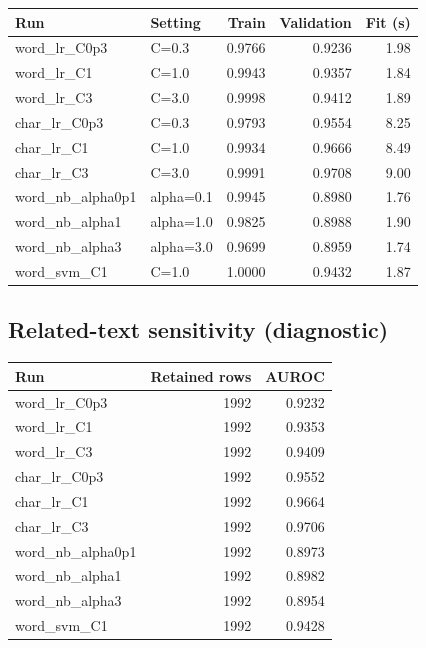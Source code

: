 \begin{center}\small\begin{tabular}{p{3.1cm}p{2.2cm}rrr}
\toprule
Run & Setting & Train & Validation & Fit (s) \\
\midrule
word\_lr\_C0p3 & C=0.3 & 0.9766 & 0.9236 & 1.98 \\
word\_lr\_C1 & C=1.0 & 0.9943 & 0.9357 & 1.84 \\
word\_lr\_C3 & C=3.0 & 0.9998 & 0.9412 & 1.89 \\
char\_lr\_C0p3 & C=0.3 & 0.9793 & 0.9554 & 8.25 \\
char\_lr\_C1 & C=1.0 & 0.9934 & 0.9666 & 8.49 \\
char\_lr\_C3 & C=3.0 & 0.9991 & 0.9708 & 9.00 \\
word\_nb\_alpha0p1 & alpha=0.1 & 0.9945 & 0.8980 & 1.76 \\
word\_nb\_alpha1 & alpha=1.0 & 0.9825 & 0.8988 & 1.90 \\
word\_nb\_alpha3 & alpha=3.0 & 0.9699 & 0.8959 & 1.74 \\
word\_svm\_C1 & C=1.0 & 1.0000 & 0.9432 & 1.87 \\
\bottomrule\end{tabular}\end{center}

\subsection*{Related-text sensitivity (diagnostic)}

\begin{center}\small\begin{tabular}{p{5cm}rr}
\toprule
Run & Retained rows & AUROC \\
\midrule
word\_lr\_C0p3 & 1992 & 0.9232 \\
word\_lr\_C1 & 1992 & 0.9353 \\
word\_lr\_C3 & 1992 & 0.9409 \\
char\_lr\_C0p3 & 1992 & 0.9552 \\
char\_lr\_C1 & 1992 & 0.9664 \\
char\_lr\_C3 & 1992 & 0.9706 \\
word\_nb\_alpha0p1 & 1992 & 0.8973 \\
word\_nb\_alpha1 & 1992 & 0.8982 \\
word\_nb\_alpha3 & 1992 & 0.8954 \\
word\_svm\_C1 & 1992 & 0.9428 \\
\bottomrule\end{tabular}\end{center}

